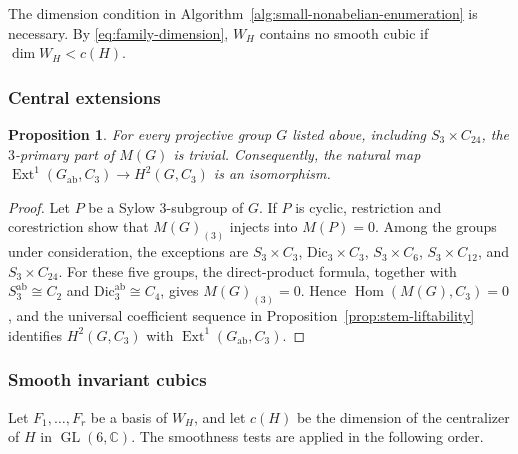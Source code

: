 \documentclass[12pt]{amsart}
\numberwithin{equation}{section}
\theoremstyle{plain}
\newtheorem{prop}[thm]{Proposition}
\theoremstyle{definition}
\theoremstyle{remark}
\newcommand{\CC}{\mathbb C}
\DeclareMathOperator{\GL}{GL}
\DeclareMathOperator{\Hom}{Hom}
\begin{document}
The dimension condition in
Algorithm~\ref{alg:small-nonabelian-enumeration}
is necessary. By \eqref{eq:family-dimension}, $W_H$ contains no smooth
cubic if $\dim W_H<c(H)$.

\subsubsection{Central extensions}

\begin{prop}\label{prop:small-nonabelian-nonliftable-completeness}
For every projective group $G$ listed above, including $S_3\times C_{24}$,
the $3$-primary part of $M(G)$ is trivial.  Consequently, the natural map
$\operatorname{Ext}^1(G_{\mathrm{ab}},C_3)\to H^2(G,C_3)$ is an isomorphism.
\end{prop}

\begin{proof}
Let $P$ be a Sylow $3$-subgroup of $G$.  If $P$ is cyclic,
restriction and corestriction show that $M(G)_{(3)}$ injects into
$M(P)=0$.  Among the groups under consideration, the exceptions are
$S_3\times C_3$, $\mathrm{Dic}_3\times C_3$, $S_3\times C_6$,
$S_3\times C_{12}$, and $S_3\times C_{24}$.  For these five groups, the
direct-product formula, together with
$S_3^{\mathrm{ab}}\cong C_2$ and
$\mathrm{Dic}_3^{\mathrm{ab}}\cong C_4$, gives
$M(G)_{(3)}=0$.  Hence $\Hom(M(G),C_3)=0$, and the universal coefficient
sequence in Proposition~\ref{prop:stem-liftability} identifies
$H^2(G,C_3)$ with $\operatorname{Ext}^1(G_{\mathrm{ab}},C_3)$.
\end{proof}

\subsubsection{Smooth invariant cubics}

Let $F_1,\ldots,F_r$ be a basis of $W_H$, and let $c(H)$ be the
dimension of the centralizer of $H$ in $\GL(6,\CC)$.  The smoothness tests
are applied in the following order.
\end{document}
